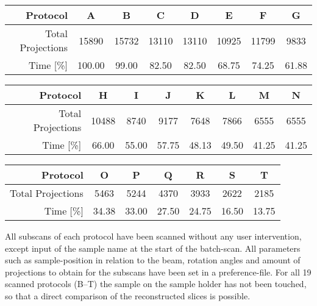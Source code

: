 \cbstart
\begin{table*}
	\centering
	\caption{Specification of different protocols and time used compared to gold standard. Protocol A corresponds to the Gold Standard, and would have been needed to cover the same FOV with 9 independent scans with a detector width of 1024 pixels (plus an overlap of 100 pixels), resulting in a number of projections $N_{A}=9(1024+100)\frac{\pi}{2}=15890$. Protocol B corresponds to the protocol shown in figure~\ref{subfig:protocolb}, resulting in a total number of projextions of $N_{B}=3(3072+200)\frac{\pi}{2}=15419$.}
	\begin{tabular*}{\textwidth}{r@{\extracolsep\fill}ccccccc}
		\toprule
		Protocol & A & B & C & D & E & F & G \\
		\midrule
		Total Projections & 15890 & 15732 & 13110 & 13110 & 10925 & 11799 & 9833 \\
		Time [\%] & 100.00 & 99.00 & 82.50 & 82.50 & 68.75 & 74.25 & 61.88 \\
		\bottomrule
	\end{tabular*}
	\begin{tabular*}{\textwidth}{r@{\extracolsep\fill}ccccccc}
		\toprule
		Protocol & H & I & J & K & L & M & N \\
		\midrule
		Total Projections & 10488 & 8740 & 9177 & 7648 & 7866 & 6555 & 6555 \\
		Time [\%] & 66.00 & 55.00 & 57.75 & 48.13 & 49.50 & 41.25 & 41.25 \\
		\bottomrule
	\end{tabular*}
	\begin{tabular*}{\textwidth}{r@{\extracolsep\fill}cccccc}
		\toprule
		Protocol & O & P & Q & R & S & T \\
		\midrule
		Total Projections & 5463 & 5244 & 4370 & 3933 & 2622 & 2185 \\
		Time [\%] & 34.38 & 33.00 & 27.50 & 24.75 & 16.50 & 13.75 \\
		\bottomrule
	\end{tabular*}
	\label{tab:projections}
\end{table*}
\cbend

\cbstart
All subscans of each protocol have been scanned without any user intervention, except input of the sample name at the start of the batch-scan. All parameters such as sample-position in relation to the beam, rotation angles and amount of projections to obtain for the subscans have been set in a preference-file. For all 19 scanned protocols (B--T) the sample on the sample holder has not been touched, so that a direct comparison of the reconstructed slices is possible.

